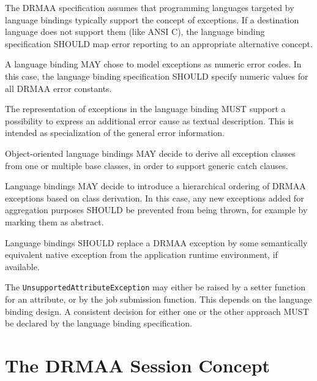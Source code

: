 \documentclass{article}
\newcommand{\h}[1]{\lstinline|#1|}
\newcommand{\langbind}[1]{\begin{shaded}#1\end{shaded}}
\newcommand{\rat}[1]{}
\begin{document}
\langbind{
The DRMAA specification assumes that programming languages targeted by language bindings typically support the concept of exceptions. If a destination language does not support them (like ANSI C), the language binding specification SHOULD map error reporting to an appropriate alternative concept. 

A language binding MAY chose to model exceptions as numeric error codes. In this case, the language binding specification SHOULD specify numeric values for all DRMAA error constants. 

The representation of exceptions in the language binding MUST support a possibility to express an additional error cause as textual description. This is intended as specialization of the general error information. 

Object-oriented language bindings MAY decide to derive all exception classes from one or multiple base classes, in order to support generic catch clauses. 

Language bindings MAY decide to introduce a hierarchical ordering of DRMAA exceptions based on class derivation. In this case, any new exceptions added for aggregation purposes SHOULD be prevented from being thrown, for example by marking them as abstract. 

Language bindings SHOULD replace a DRMAA exception by some semantically equivalent native exception from the application runtime environment, if available.

The \h{UnsupportedAttributeException} may either be raised by a setter function for an attribute, or by the job submission function. This depends on the language binding design. A consistent decision for either one or the other approach MUST be declared by the language binding specification.
}

\rat{
Comparison to DRMAA 1.0: The InconsistentStateException was removed, since it is semantically equal to the InvalidStateException (conf. call Jan 7th 2010) The former HoldInconsistentStateException, ReleaseInconsistentStateException, ResumeInconsistentStateException, and SuspendInconsistentStateException from DRMAA v1.0 are now expressed as single InvalidStateException with different meaning per raising method. (F2F meeting July 2009)
}

\section{The DRMAA Session Concept}
\label{sec:sessionconcept}
\end{document}
